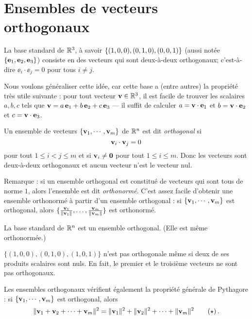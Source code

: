 \section{Ensembles de vecteurs orthogonaux}

La base standard de $\mathbb{R}^3$, \`a savoir $\{(1,0,0), (0,1,0), (0,0,1)\}$ (aussi notée $\{\mathbf{e}_1, \mathbf{e}_2, \mathbf{e}_3\}$) consiste en des vecteurs qui sont deux-à-deux orthogonaux; c'est-à-dire 
$
\ee_i \cdot \ee_j = 0
$ pour tous $ i\not=j$.

Nous voulons généraliser cette idée, car cette base a (entre autres) la propriété très utile suivante : pour tout vecteur $\mathbf{v} \in \mathbb{R}^3$, il est facile de trouver les scalaires $a,b,c$ tels que $\mathbf{v}= a \,\mathbf{e}_1 +b\,\mathbf{e}_2+ c\,\mathbf{e}_3$ --- il suffit de calculer $a=\mathbf{v}\cdot \mathbf{e}_1$ et  $b=\mathbf{v}\cdot \mathbf{e}_2$ et $c=\mathbf{v}\cdot \mathbf{e}_3$.

\begin{definition}
Un ensemble de vecteurs $\{\mathbf{v}_1, \cdots, \mathbf{v}_m\}$ de $\mathbb{R}^n$ est dit \emph{orthogonal}  si
 $$
\mathbf{v}_i \cdot \mathbf{v}_j = 0
$$
pour tout $1 \leq i < j \leq m$ et si $\mathbf{v}_i\not=\mathbf{0}$ pour tout $1 \leq i  \leq m$. Donc les vecteurs sont deux-à-deux orthogonaux et aucun vecteur n'est le vecteur nul.
\end{definition}

Remarque : si un ensemble orthogonal est constitué de vecteurs qui sont tous de norme $1$, alors l'ensemble est dit {\it orthonorm\'e}. C'est assez facile d'obtenir une ensemble orthonormé à partir d'un ensemble orthogonal : si $\{\mathbf{v}_1, \cdots, \mathbf{v}_m\}$ est orthogonal, alors 
$\{\frac{\mathbf{v}_1}{\|\mathbf{v}_1\|}, \dots, \frac{\mathbf{v}_m}{\|\mathbf{v}_m\|}\}$ est orthonormé.


\begin{myexample} La base standard de $\mathbb{R}^n$ est un ensemble orthogonal. (Elle est même orthonormée.) \end{myexample}

\begin{myexample} $\{ (1,0,0), (0,1,0), (1,0,1)\}$ n'est pas orthogonale même si deux de ses produits scalaires sont nuls.
En fait, le premier et le troisième vecteurs ne sont pas orthogonaux. \end{myexample}

Les ensembles orthogonaux vérifient également la propriété générale de Pythagore : si $\{\mathbf{v}_1, \cdots, \mathbf{v}_m\}$ est orthogonal, alors 
\begin{equation*} \|\mathbf{v}_1 + \mathbf{v}_2 +\cdots + \mathbf{v}_m\|^2 =\|\mathbf{v}_1\|^2 + \|\mathbf{v}_2\|^2 +\cdots + \|\mathbf{v}_m\|^2 \tag{$\star$}\,. \label{eqn:Pythag}
\end{equation*}

